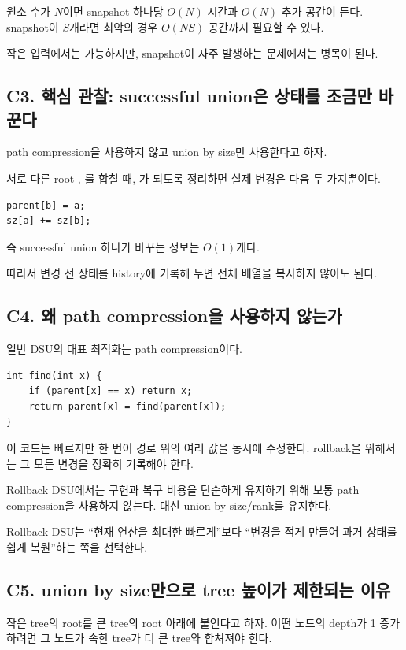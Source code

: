 원소 수가 $N$이면 snapshot 하나당 $O(N)$ 시간과 $O(N)$ 추가 공간이 든다. snapshot이 $S$개라면 최악의 경우 $O(NS)$ 공간까지 필요할 수 있다.

작은 입력에서는 가능하지만, snapshot이 자주 발생하는 문제에서는 병목이 된다.

\subsection{C3. 핵심 관찰: successful union은 상태를 조금만 바꾼다}
path compression을 사용하지 않고 union by size만 사용한다고 하자.

서로 다른 root , 를 합칠 때, 가 되도록 정리하면 실제 변경은 다음 두 가지뿐이다.
\begin{lstlisting}
parent[b] = a;
sz[a] += sz[b];
\end{lstlisting}

즉 successful union 하나가 바꾸는 정보는 $O(1)$개다.

따라서 변경 전 상태를 history에 기록해 두면 전체 배열을 복사하지 않아도 된다.

\subsection{C4. 왜 path compression을 사용하지 않는가}
일반 DSU의 대표 최적화는 path compression이다.
\begin{lstlisting}
int find(int x) {
    if (parent[x] == x) return x;
    return parent[x] = find(parent[x]);
}
\end{lstlisting}

이 코드는 빠르지만  한 번이 경로 위의 여러  값을 동시에 수정한다. rollback을 위해서는 그 모든 변경을 정확히 기록해야 한다.

Rollback DSU에서는 구현과 복구 비용을 단순하게 유지하기 위해 보통 path compression을 사용하지 않는다. 대신 union by size/rank를 유지한다.

\begin{keybox}
Rollback DSU는 ``현재 연산을 최대한 빠르게''보다 ``변경을 적게 만들어 과거 상태를 쉽게 복원''하는 쪽을 선택한다.
\end{keybox}

\subsection{C5. union by size만으로 tree 높이가 제한되는 이유}
작은 tree의 root를 큰 tree의 root 아래에 붙인다고 하자. 어떤 노드의 depth가 1 증가하려면 그 노드가 속한 tree가 더 큰 tree와 합쳐져야 한다.


